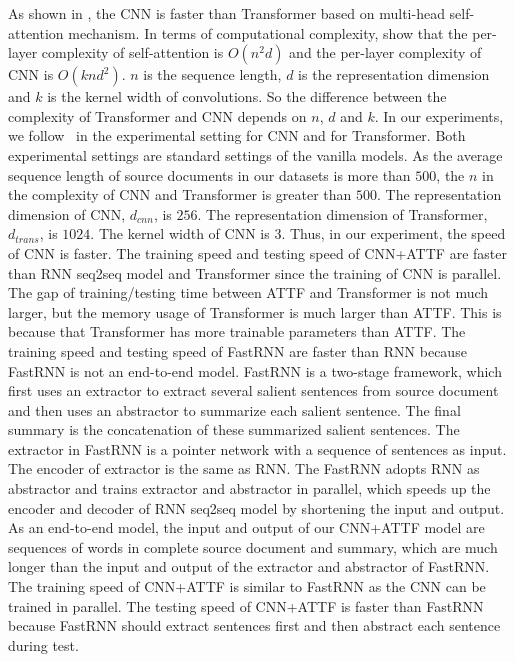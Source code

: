 As shown in , the CNN is faster than Transformer based on multi-head self-attention mechanism.
In terms of computational complexity,
\cite{Attn17} show that the per-layer complexity of self-attention is $O(n^2d)$ and the per-layer complexity of CNN is $O(knd^2)$. $n$ is the sequence length, $d$ is the representation dimension and $k$ is the kernel width of convolutions.  So the difference between the complexity of Transformer and CNN depends on $n$, $d$ and $k$. 
In our experiments, we follow~\cite{gehring2017convs2s} in the experimental setting for CNN and \cite{Attn17} for Transformer. Both experimental settings are standard settings of the vanilla models. 
As the average sequence length of source documents in our datasets is more than $500$, the $n$ in the complexity of CNN and Transformer is greater than $500$. 
The representation dimension of CNN, $d_{cnn}$, is $256$.  
The representation dimension of Transformer, $d_{trans}$, is $1024$.
The kernel width of CNN is $3$. 
Thus, in our experiment, the speed of CNN is faster. 
The training speed and testing speed of CNN+ATTF 
are faster than RNN seq2seq model and Transformer
since the training of CNN is parallel.
The gap of training/testing time between ATTF and Transformer is not much larger,
but the memory usage of Transformer is much larger than ATTF.
This is because that Transformer has more trainable parameters than ATTF.
The training speed and testing speed of FastRNN are faster than RNN
because FastRNN is not an end-to-end model. FastRNN is a two-stage framework, which first uses an extractor to extract several salient sentences from source document and then uses an abstractor to summarize each salient sentence. The final summary is the concatenation of these summarized salient sentences. The extractor in FastRNN is a pointer network with a sequence of sentences as input.
The encoder of extractor is the same as RNN. The FastRNN adopts RNN as abstractor and trains extractor and abstractor in parallel, which speeds up the encoder and decoder of RNN seq2seq model by shortening the input and output. As an end-to-end model, the input and output of our CNN+ATTF model are sequences of words in complete source document and summary, which are much longer than the input and output of the extractor and abstractor of FastRNN. The training speed of CNN+ATTF is similar to FastRNN as the CNN can be trained in parallel. The testing speed of CNN+ATTF is faster than FastRNN because FastRNN should extract sentences first and then abstract each sentence during test.


